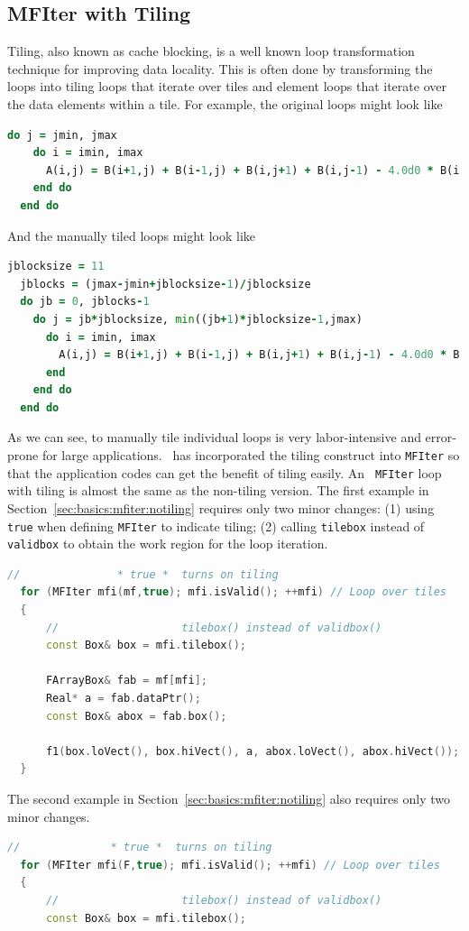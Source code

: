 {{{\subsection{MFIter with Tiling}
\label{sec:basics:mfiter:tiling}

Tiling, also known as cache blocking, is a well known loop
transformation technique for improving data locality.  This is often
done by transforming the loops into tiling loops that iterate over
tiles and element loops that iterate over the data elements within a
tile.  For example, the original loops might look like
\begin{lstlisting}[language=fortran]
  do j = jmin, jmax
    do i = imin, imax
      A(i,j) = B(i+1,j) + B(i-1,j) + B(i,j+1) + B(i,j-1) - 4.0d0 * B(i,j)
    end do
  end do
\end{lstlisting}
And the manually tiled loops might look like
\begin{lstlisting}[language=fortran]
  jblocksize = 11
  jblocks = (jmax-jmin+jblocksize-1)/jblocksize
  do jb = 0, jblocks-1
    do j = jb*jblocksize, min((jb+1)*jblocksize-1,jmax)
      do i = imin, imax
        A(i,j) = B(i+1,j) + B(i-1,j) + B(i,j+1) + B(i,j-1) - 4.0d0 * B(i,j)
      end
    end do
  end do
\end{lstlisting}
As we can see, to manually tile individual loops is very
labor-intensive and error-prone for large applications.  \amrex\ has
incorporated the tiling construct into {\tt MFIter} so that the
application codes can get the benefit of tiling easily.  An {\tt
  MFIter} loop with tiling is almost the same as the non-tiling
version.  The first example in
Section~\ref{sec:basics:mfiter:notiling} requires only two minor
changes: (1) using {\tt true} when defining {\tt MFIter} to indicate
tiling; (2) calling {\tt tilebox} instead of {\tt validbox} to obtain
the work region for the loop iteration.
\begin{lstlisting}[language=cpp]
  //               * true *  turns on tiling
  for (MFIter mfi(mf,true); mfi.isValid(); ++mfi) // Loop over tiles
  {
      //                   tilebox() instead of validbox()
      const Box& box = mfi.tilebox();

      FArrayBox& fab = mf[mfi];
      Real* a = fab.dataPtr();
      const Box& abox = fab.box();

      f1(box.loVect(), box.hiVect(), a, abox.loVect(), abox.hiVect());
  }
\end{lstlisting}
The second example in Section~\ref{sec:basics:mfiter:notiling} also
requires only two minor changes.
\begin{lstlisting}[language=cpp]
  //              * true *  turns on tiling  
  for (MFIter mfi(F,true); mfi.isValid(); ++mfi) // Loop over tiles
  {
      //                   tilebox() instead of validbox()
      const Box& box = mfi.tilebox();


\end{lstlisting}}}}
